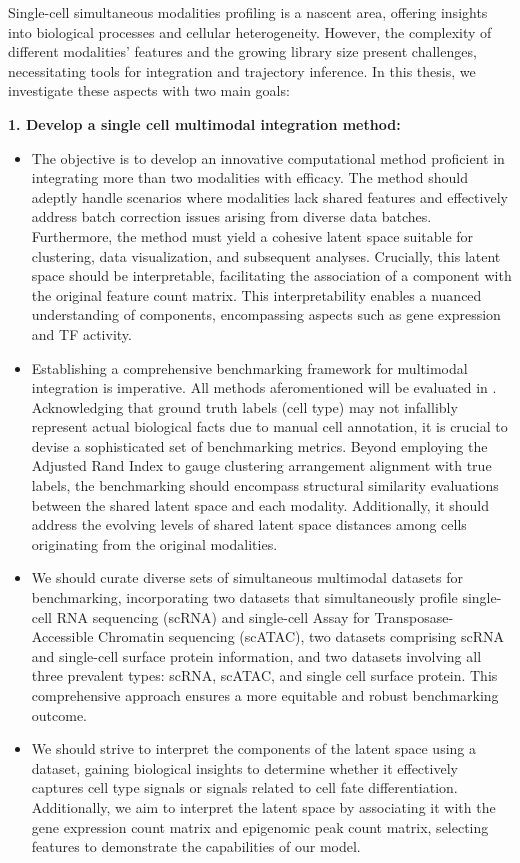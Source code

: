 Single-cell simultaneous modalities profiling is a nascent area, offering insights into biological processes and cellular heterogeneity. However, the complexity of different modalities' features and the growing library size present challenges, necessitating tools for integration and trajectory inference. In this thesis, we investigate these aspects with two main goals:



\textbf{1. Develop a single cell multimodal integration method:}
\begin{itemize}
	\item 
	The objective is to develop an innovative computational method proficient in integrating more than two modalities with efficacy. The method should adeptly handle scenarios where modalities lack shared features and effectively address batch correction issues arising from diverse data batches. Furthermore, the method must yield a cohesive latent space suitable for clustering, data visualization, and subsequent analyses. Crucially, this latent space should be interpretable, facilitating the association of a component with the original feature count matrix. This interpretability enables a nuanced understanding of components, encompassing aspects such as gene expression and TF activity.
	\item 
	Establishing a comprehensive benchmarking framework for multimodal integration is imperative. All methods aferomentioned will be evaluated in . Acknowledging that ground truth labels (cell type) may not infallibly represent actual biological facts due to manual cell annotation, it is crucial to devise a sophisticated set of benchmarking metrics. Beyond employing the Adjusted Rand Index to gauge clustering arrangement alignment with true labels, the benchmarking should encompass structural similarity evaluations between the shared latent space and each modality. Additionally, it should address the evolving levels of shared latent space distances among cells originating from the original modalities.
 
	\item 
	We should curate diverse sets of simultaneous multimodal datasets for benchmarking, incorporating two datasets that simultaneously profile single-cell RNA sequencing (scRNA) and single-cell Assay for Transposase-Accessible Chromatin sequencing (scATAC), two datasets comprising scRNA and single-cell surface protein information, and two datasets involving all three prevalent types: scRNA, scATAC, and single cell surface protein. This comprehensive approach ensures a more equitable and robust benchmarking outcome.

	\item 
	We should strive to interpret the components of the latent space using a dataset, gaining biological insights to determine whether it effectively captures cell type signals or signals related to cell fate differentiation. Additionally, we aim to interpret the latent space by associating it with the gene expression count matrix and epigenomic peak count matrix, selecting features to demonstrate the capabilities of our model.
\end{itemize}

